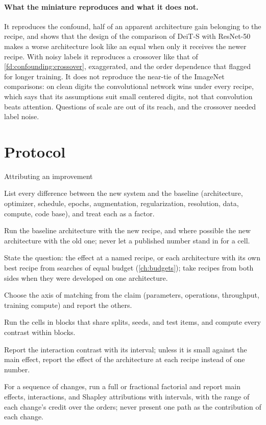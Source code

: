 \begin{refsection}
\paragraph{What the miniature reproduces and what it does not.} It reproduces the confound, half of an apparent architecture gain belonging to the recipe, and shows that the design of the comparison of DeiT-S with ResNet-50 makes a worse architecture look like an equal when only it receives the newer recipe. With noisy labels it reproduces a crossover like that of \cref{fd:confounding:crossover}, exaggerated, and the order dependence that \textcite{BelloEtAl2021} flagged for longer training. It does not reproduce the near-tie of the ImageNet comparisons: on clean digits the convolutional network wins under every recipe, which says that its assumptions suit small centered digits, not that convolution beats attention. Questions of scale are out of its reach, and the crossover needed label noise.

\section{Protocol}\label{sec:confounding:protocol}

\begin{protocol}{Attributing an improvement}\label{prot:confounding:attribute}
\item List every difference between the new system and the baseline (architecture, optimizer, schedule, epochs, augmentation, regularization, resolution, data, compute, code base), and treat each as a factor.
\item Run the baseline architecture with the new recipe, and where possible the new architecture with the old one; never let a published number stand in for a cell.
\item State the question: the effect at a named recipe, or each architecture with its own best recipe from searches of equal budget (\cref{ch:budgets}); take recipes from both sides when they were developed on one architecture.
\item Choose the axis of matching from the claim (parameters, operations, throughput, training compute) and report the others.
\item Run the cells in blocks that share splits, seeds, and test items, and compute every contrast within blocks.
\item Report the interaction contrast with its interval; unless it is small against the main effect, report the effect of the architecture at each recipe instead of one number.
\item For a sequence of changes, run a full or fractional factorial and report main effects, interactions, and Shapley attributions with intervals, with the range of each change's credit over the orders; never present one path as the contribution of each change.
\end{protocol}


\end{refsection}
